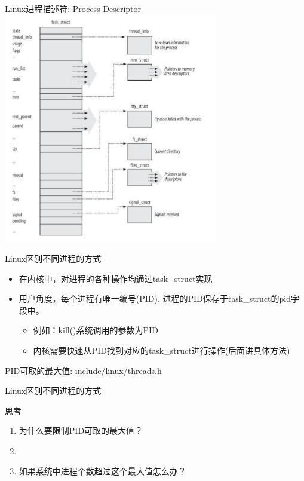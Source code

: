 \documentclass[xcolor=svgnames]{beamer}
\begin{document}
\begin{CJK*}{UTF8}{gbsn}
\begin{frame}{Linux进程描述符: Process Descriptor}
\includegraphics[width=0.7\textwidth]{taskstruct.png}
\end{frame}

\begin{frame}{Linux区别不同进程的方式}
\begin{itemize}
\item 在内核中，对进程的各种操作均通过task\_struct实现
\item 用户角度，每个进程有唯一编号(PID). 进程的PID保存于task\_struct的pid字段中。
\begin{itemize}
\item 例如：kill()系统调用的参数为PID
\item 内核需要快速从PID找到对应的task\_struct进行操作(后面讲具体方法)
\end{itemize}
\end{itemize}
\begin{block}{PID可取的最大值: include/linux/threads.h}
\lstpidmax
\end{block}
\end{frame}

\begin{frame}{Linux区别不同进程的方式}
\begin{block}{思考}
\begin{enumerate}
\item 为什么要限制PID可取的最大值？
\item[]
\item 如果系统中进程个数超过这个最大值怎么办？
\end{enumerate}
\end{block}
\end{frame}


\end{CJK*}
\end{document}
